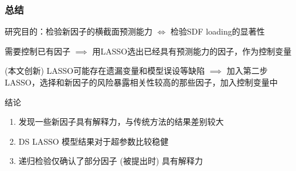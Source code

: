 \documentclass[
  UTF8,
  xcolor={dvipsnames,rgb},
  hyperref={colorlinks, citecolor=orange, linkcolor=black},
  aspectratio=169
  ]{beamer}
\begin{document}
\begin{frame}
    \frametitle{总结}

    \begin{wideitemize}
        \item 研究目的：检验新因子的横截面预测能力 \(\iff\) 检验SDF loading的显著性
        \item 需要控制已有因子 \(\implies\) 用LASSO选出已经具有预测能力的因子，作为控制变量
        \item (本文创新) LASSO可能存在遗漏变量和模型误设等缺陷 \(\implies\) 加入第二步LASSO，选择和新因子的风险暴露相关性较高的那些因子，加入控制变量中
        \item 结论 \begin{enumerate}
            \item 发现一些新因子具有解释力，与传统方法的结果差别较大
            \item DS LASSO 模型结果对于超参数比较稳健
            \item 递归检验仅确认了部分因子 (被提出时) 具有解释力
        \end{enumerate}
    \end{wideitemize}
\end{frame}

\appendix

\begin{frame}[allowframebreaks]
  \printbibliography
\end{frame}
\end{document}
